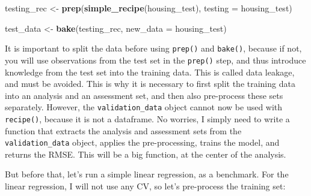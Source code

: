 \documentclass[]{gitbook}
\newenvironment{Shaded}{\begin{snugshade}}{\end{snugshade}}
\newcommand{\DataTypeTok}[1]{\textcolor[rgb]{0.13,0.29,0.53}{#1}}
\newcommand{\KeywordTok}[1]{\textcolor[rgb]{0.13,0.29,0.53}{\textbf{#1}}}
\newcommand{\NormalTok}[1]{#1}
\newcommand{\OperatorTok}[1]{\textcolor[rgb]{0.81,0.36,0.00}{\textbf{#1}}}
\newcommand{\StringTok}[1]{\textcolor[rgb]{0.31,0.60,0.02}{#1}}
\theoremstyle{definition}
\theoremstyle{definition}
\theoremstyle{definition}
\theoremstyle{remark}
\begin{document}
\begin{Shaded}
\begin{Highlighting}[]
\NormalTok{testing_rec <-}\StringTok{ }\KeywordTok{prep}\NormalTok{(}\KeywordTok{simple_recipe}\NormalTok{(housing_test), }\DataTypeTok{testing =}\NormalTok{ housing_test)}

\NormalTok{test_data <-}\StringTok{ }\KeywordTok{bake}\NormalTok{(testing_rec, }\DataTypeTok{new_data =}\NormalTok{ housing_test)}
\end{Highlighting}
\end{Shaded}

It is important to split the data before using \texttt{prep()} and
\texttt{bake()}, because if not, you will use observations from the test
set in the \texttt{prep()} step, and thus introduce knowledge from the
test set into the training data. This is called data leakage, and must
be avoided. This is why it is necessary to first split the training data
into an analysis and an assessment set, and then also pre-process these
sets separately. However, the \texttt{validation\_data} object cannot
now be used with \texttt{recipe()}, because it is not a dataframe. No
worries, I simply need to write a function that extracts the analysis
and assessment sets from the \texttt{validation\_data} object, applies
the pre-processing, trains the model, and returns the RMSE. This will be
a big function, at the center of the analysis.

But before that, let's run a simple linear regression, as a benchmark.
For the linear regression, I will not use any CV, so let's pre-process
the training set:

\begin{Shaded}
\end{Shaded}
\end{document}
